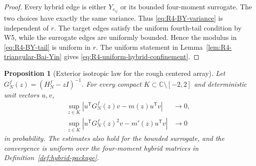 \documentclass[11pt]{article}
\newtheorem{proposition}[theorem]{Proposition}
\theoremstyle{definition}
\theoremstyle{remark}
\begin{document}
\begin{proof}
Every hybrid edge is either \(Y_{s_{ij}}\) or its bounded four-moment
surrogate.  The two choices have exactly the same variance.  Thus
\eqref{eq:R4-BY-variance} is independent of \(r\).  The target edges satisfy
the uniform fourth-tail condition by W5, while the surrogate edges are
uniformly bounded.  Hence the modulus in \eqref{eq:R4-BY-tail} is uniform in
\(r\).  The uniform statement in
Lemma~\ref{lem:R4-triangular-Bai-Yin} gives
\eqref{eq:R4-uniform-hybrid-confinement}.
\end{proof}

\begin{proposition}[Exterior isotropic law for the rough centered array]
\label{prop:R4-rough-isotropic}
Let \(G_N^f(z)=(H_N^f-zI)^{-1}\).  For every compact
\(K\subset\mathbb C\setminus[-2,2]\) and deterministic unit vectors \(u,v\),
\begin{align}
 \sup_{z\in K}\left|
 u^{\mathsf T}G_N^f(z)v-m(z)u^{\mathsf T}v
 \right|&\longrightarrow0,\label{eq:R4-rough-isotropic}\\
 \sup_{z\in K}\left|
 u^{\mathsf T}G_N^f(z)^2v-m'(z)u^{\mathsf T}v
 \right|&\longrightarrow0
 \label{eq:R4-rough-isotropic-derivative}
\end{align}
in probability.  The estimates also hold for the bounded surrogate, and the
convergence is uniform over the four-moment hybrid matrices in
Definition~\ref{def:hybrid-package}.
\end{proposition}
\end{document}
